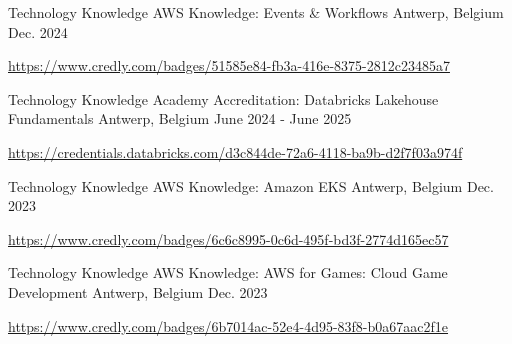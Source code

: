 

\begin{cventries}

  \cventry
    {Technology Knowledge} %
    {AWS Knowledge: Events \& Workflows} %
    {Antwerp, Belgium} %
    {Dec. 2024} %
    {
      \begin{cvitems} %
        \item \url{https://www.credly.com/badges/51585e84-fb3a-416e-8375-2812c23485a7}
      \end{cvitems}
    }

  \cventry
    {Technology Knowledge} %
    {Academy Accreditation: Databricks Lakehouse Fundamentals} %
    {Antwerp, Belgium} %
    {June 2024 - June 2025} %
    {
      \begin{cvitems} %
        \item \url{https://credentials.databricks.com/d3c844de-72a6-4118-ba9b-d2f7f03a974f}
      \end{cvitems}
    }

  \cventry
    {Technology Knowledge} %
    {AWS Knowledge: Amazon EKS} %
    {Antwerp, Belgium} %
    {Dec. 2023} %
    {
      \begin{cvitems} %
        \item \url{https://www.credly.com/badges/6c6c8995-0c6d-495f-bd3f-2774d165ec57}
      \end{cvitems}
    }

  \cventry
    {Technology Knowledge} %
    {AWS Knowledge: AWS for Games: Cloud Game Development} %
    {Antwerp, Belgium} %
    {Dec. 2023} %
    {
      \begin{cvitems} %
        \item \url{https://www.credly.com/badges/6b7014ac-52e4-4d95-83f8-b0a67aac2f1e}
      \end{cvitems}
    }


\end{cventries}
